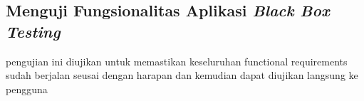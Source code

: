 
\subsection{Menguji Fungsionalitas Aplikasi \textit{Black Box Testing}}
pengujian ini diujikan untuk memastikan keseluruhan functional requirements sudah berjalan seusai dengan harapan dan kemudian dapat diujikan langsung ke pengguna
